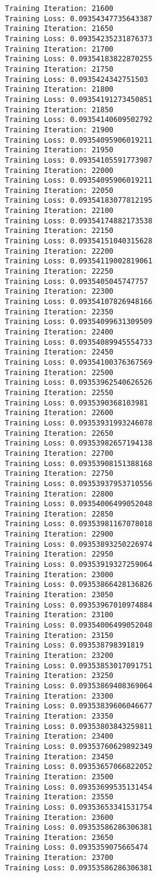 \documentclass[11pt]{article}
\begin{document}
\begin{Verbatim}[commandchars=\\\{\}]
Training Iteration: 21600
Training Loss: 0.09354347735643387
Training Iteration: 21650
Training Loss: 0.09354235231876373
Training Iteration: 21700
Training Loss: 0.09354183822870255
Training Iteration: 21750
Training Loss: 0.0935424342751503
Training Iteration: 21800
Training Loss: 0.09354191273450851
Training Iteration: 21850
Training Loss: 0.09354140609502792
Training Iteration: 21900
Training Loss: 0.09354095906019211
Training Iteration: 21950
Training Loss: 0.09354105591773987
Training Iteration: 22000
Training Loss: 0.09354095906019211
Training Iteration: 22050
Training Loss: 0.09354183077812195
Training Iteration: 22100
Training Loss: 0.09354174882173538
Training Iteration: 22150
Training Loss: 0.09354151040315628
Training Iteration: 22200
Training Loss: 0.09354119002819061
Training Iteration: 22250
Training Loss: 0.0935405045747757
Training Iteration: 22300
Training Loss: 0.09354107826948166
Training Iteration: 22350
Training Loss: 0.09354099631309509
Training Iteration: 22400
Training Loss: 0.09354089945554733
Training Iteration: 22450
Training Loss: 0.09354100376367569
Training Iteration: 22500
Training Loss: 0.09353962540626526
Training Iteration: 22550
Training Loss: 0.0935390368103981
Training Iteration: 22600
Training Loss: 0.09353931993246078
Training Iteration: 22650
Training Loss: 0.09353982657194138
Training Iteration: 22700
Training Loss: 0.09353908151388168
Training Iteration: 22750
Training Loss: 0.09353937953710556
Training Iteration: 22800
Training Loss: 0.09354006499052048
Training Iteration: 22850
Training Loss: 0.09353981167078018
Training Iteration: 22900
Training Loss: 0.09353893250226974
Training Iteration: 22950
Training Loss: 0.09353919327259064
Training Iteration: 23000
Training Loss: 0.09353866428136826
Training Iteration: 23050
Training Loss: 0.09353967010974884
Training Iteration: 23100
Training Loss: 0.09354006499052048
Training Iteration: 23150
Training Loss: 0.093538798391819
Training Iteration: 23200
Training Loss: 0.09353853017091751
Training Iteration: 23250
Training Loss: 0.09353869408369064
Training Iteration: 23300
Training Loss: 0.09353839606046677
Training Iteration: 23350
Training Loss: 0.09353803843259811
Training Iteration: 23400
Training Loss: 0.09353760629892349
Training Iteration: 23450
Training Loss: 0.09353657066822052
Training Iteration: 23500
Training Loss: 0.09353699535131454
Training Iteration: 23550
Training Loss: 0.09353653341531754
Training Iteration: 23600
Training Loss: 0.09353586286306381
Training Iteration: 23650
Training Loss: 0.0935359075665474
Training Iteration: 23700
Training Loss: 0.09353586286306381

\end{Verbatim}
\end{document}
